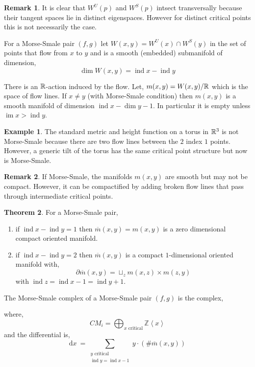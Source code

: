 \documentclass[12pt]{extarticle}
\DeclareMathOperator{\im}{\mathrm{im}}
\newcommand{\Z}{\mathbb{Z}}
\renewcommand{\d}[1]{ \mathrm{d}#1 \:}
\DeclareMathOperator{\ind}{\mathrm{ind}}
\theoremstyle{definition}
\newtheorem{theorem}{Theorem}[section]
\newtheorem{example}[theorem]{Example}
\newtheorem{remark}{Remark}
\newenvironment{definition}[1][Definition:]{\begin{trivlist}
\item[\hskip \labelsep {\bfseries #1}]}{\end{trivlist}}
\begin{document}
\begin{remark}
It is clear that $W^U(p)$ and $W^S(p)$ intsect transversally because their tangent spaces lie in distinct eigenspaces. However for distinct critical points this is not necessarily the case. 
\end{remark}

\begin{definition}
For a Morse-Smale pair $(f, g)$ let $W(x,y) = W^U(x) \cap W^S(y)$ in the set of points that flow from $x$ to $y$ and is a smooth (embedded) submanifold of dimension,
\[ \dim{W(x,y)} = \ind{x} - \ind{y} \]
\end{definition}

\begin{definition}
There is an $\mathbb{R}$-action induced by the flow. Let, $m(x,y) = W(x,y) / \mathbb{R}$ which is the space of flow lines. If $x \neq y$ (with Morse-Smale condition) then $m(x,y)$ is a smooth manifold of dimension $\ind{x} - \dim{y} - 1$. In particular it is empty unless $\im{x} > \ind{y}$. 
\end{definition}

\begin{example}
The standard metric and height function on a torus in $\mathbb{R}^3$ is not Morse-Smale because there are two flow lines between the $2$ index $1$ points. However, a generic tilt of the torus has the same critical point structure but now is Morse-Smale. 
\end{example}

\begin{remark}
If Morse-Smale, the manifolds $m(x,y)$ are smooth but may not be compact. However, it can be compactified by adding broken flow lines that pass through intermediate critical points. 
\end{remark}

\begin{theorem}
For a Morse-Smale pair,
\begin{enumerate}
\item if $\ind{x} - \ind{y} = 1$ then $\overline{m}(x,y) = m(x,y)$ is a zero dimensional compact oriented manifold. 
\item if $\ind{x} - \ind{y} = 2$ then $\overline{m}(x,y)$ is a compact $1$-dimensional oriented manifold with,
\[ \partial \overline{m}(x,y) = \sqcup_{z} m(x,z) \times m(z,y) \]
with $\ind{z} = \ind{x} -1 = \ind{y} + 1$. 
\end{enumerate}
\end{theorem}

\begin{definition}
The Morse-Smale complex of a Morse-Smale pair $(f,g)$ is the complex,
\begin{center}
\end{center}
where,
\[ CM_i = \bigoplus_{x \text{ critical}} \Z \left< x \right> \]
and the differential is,
\[ \d{x} = \sum_{\substack{y \text{ critical} \\ \ind{y} = \ind{x} - 1}} y \cdot \left( \# \overline{m}(x,y) \right) \]
\end{definition}
\end{document}
